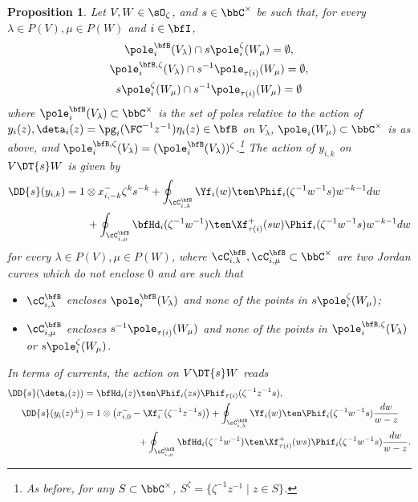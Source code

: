 \documentclass[reqno]{amsart}
\numberwithin{equation}{section}
\newtheorem*{proposition}{Proposition}
\begin{document}
\begin{proposition}\label{prop:action}
	Let $V,W\in\sO_\zeta$, and $s\in\bbC^\times$ be such that, for every $\lambda\in P(V), \mu\in P(W)$ and $i\in\bfI$, 
	\begin{equation}\label{eq:action-pole-separation}
		\begin{gathered}
		\pole^\bfB_i(V_{\lambda})
		\cap s\pole^\zeta_i(W_\mu)=\emptyset,\\
		\pole^{\bfB,\zeta}_i(V_{\lambda})
		\cap s^{-1}\pole_{\tau(i)}(W_\mu)=\emptyset,\\
		s\pole^\zeta_i(W_\mu)
		\cap s^{-1}\pole_{\tau(i)}(W_\mu)=\emptyset
		\end{gathered}
	\end{equation} 
	where $\pole^\bfB_i(V_\lambda)\subset\bbC^\times$ is the set of poles relative to the action of $y_i(z),\deta_i(z)=\pg_i(\FC^{-1}z^{-1})\eta_i(z)\in\bfB$ on $V_\lambda$, $\pole_i(W_\mu)\subset\bbC^\times$ is as above, and
	$\pole_i^{\bfB,\zeta}(V_\lambda)
	=(\pole_i^\bfB(V_\lambda))^\zeta$.\footnote{
	As before, for any $S\subset\bbC^\times$, $S^\zeta=\{\zeta^{-1}z^{-1}\mid z\in S\}$.}
The action of $y_{i,k}$ on $V\DT{s}W$ is given by
\begin{equation}\label{eq:rational-DD-y}
	\begin{split}
		\DD{s}(y_{i,k})
		&=1\otimes x^-_{i,-k}\zeta^k s^{-k}
		+\oint_{\cC^\bfB_{i,\lambda}}\Yf_i(w)\ten\Phif_i(\zeta^{-1}w^{-1}s)w^{-k-1}dw\\
		&\qquad+\oint_{\cC_{i,\mu}^\bfB}
			\bfHd_i(\zeta^{-1}w^{-1})\ten\Xf^+_{\tau(i)}(sw)\Phif_i(\zeta^{-1}w^{-1}s)
		w^{-k-1}dw\\
	\end{split}
\end{equation}
for every $\lambda\in P(V), \mu\in P(W)$, where $\cC^\bfB_{i,\lambda},\cC^\bfB_{i,\mu}\subset\bbC^\times$ are two Jordan curves which do not enclose $0$ and are such that
		\begin{itemize}\itemsep0.25cm
			\item $\cC^\bfB_{i,\lambda}$ encloses $\pole^\bfB_i(V_\lambda)$ and none of the points in $s\pole^{\zeta}_i(W_\mu)$;
			\item $\cC^\bfB_{i,\mu}$ encloses $s^{-1}\pole_{\tau(i)}(W_\mu)$ and none of the points in $\pole^{\bfB,\zeta}_i(V_\lambda)$ or $s\pole^{\zeta}_i(W_\mu)$.
		\end{itemize}
In terms of currents, the action on $V\DT{s}W$ reads
\begin{equation}\label{eq:rational-DD-y-current}
		\begin{split}
			\DD{s}(\deta_i(z))&=\bfHd_i(z)\ten\Phif_i(zs)\Phif_{\tau(i)}(\zeta^{-1}z^{-1}s),\\
			\DD{s}(y_{i}(z)^{\pm})
			&=1\otimes
			\left(x^-_{i,0}-\Xf_i^-(\zeta^{-1}z^{-1}s)\right)
			+\oint_{\cC^\bfB_{i,\lambda}}\Yf_i(w)\ten\Phif_i(\zeta^{-1}w^{-1}s)\frac{dw}{w-z}\\
			&\hspace{2cm}+\oint_{\cC_{i,\mu}^\bfB}
			\bfHd_i(\zeta^{-1}w^{-1})\ten\Xf^+_{\tau(i)}(ws)\Phif_i(\zeta^{-1}w^{-1}s)
		\frac{dw}{w-z}.
	\end{split}
\end{equation}
\end{proposition}
\end{document}
